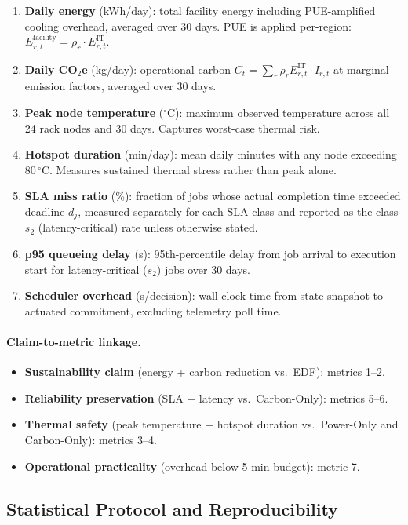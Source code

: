 \documentclass[a4paper,fleqn]{cas-dc}
\begin{document}
\begin{enumerate}
  \item \textbf{Daily energy} (kWh/day): total facility energy including PUE-amplified cooling overhead, averaged over 30 days. PUE is applied per-region: $E^{\mathrm{facility}}_{r,t} = \rho_r \cdot E^{\mathrm{IT}}_{r,t}$.
  \item \textbf{Daily CO$_2$e} (kg/day): operational carbon $C_t = \sum_r \rho_r E^{\mathrm{IT}}_{r,t} \cdot I_{r,t}$ at marginal emission factors, averaged over 30 days.
  \item \textbf{Peak node temperature} ($^\circ$C): maximum observed temperature across all 24 rack nodes and 30 days. Captures worst-case thermal risk.
  \item \textbf{Hotspot duration} (min/day): mean daily minutes with any node exceeding 80$\,^\circ$C. Measures sustained thermal stress rather than peak alone.
  \item \textbf{SLA miss ratio} (\%): fraction of jobs whose actual completion time exceeded deadline $d_j$, measured separately for each SLA class and reported as the class-$s_2$ (latency-critical) rate unless otherwise stated.
  \item \textbf{p95 queueing delay} (s): 95th-percentile delay from job arrival to execution start for latency-critical ($s_2$) jobs over 30 days.
  \item \textbf{Scheduler overhead} (s/decision): wall-clock time from state snapshot to actuated commitment, excluding telemetry poll time.
\end{enumerate}

\paragraph{Claim-to-metric linkage.}
\begin{itemize}
  \item \textbf{Sustainability claim} (energy + carbon reduction vs.\ EDF): metrics 1--2.
  \item \textbf{Reliability preservation} (SLA + latency vs.\ Carbon-Only): metrics 5--6.
  \item \textbf{Thermal safety} (peak temperature + hotspot duration vs.\ Power-Only and Carbon-Only): metrics 3--4.
  \item \textbf{Operational practicality} (overhead below 5-min budget): metric 7.
\end{itemize}

\subsection{Statistical Protocol and Reproducibility}
\label{sec:stats}
\end{document}
